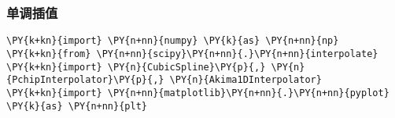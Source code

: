     \hypertarget{ux5355ux8c03ux63d2ux503c}{%
\subsubsection{单调插值}\label{ux5355ux8c03ux63d2ux503c}}

    \begin{tcolorbox}[breakable, size=fbox, boxrule=1pt, pad at break*=1mm,colback=cellbackground, colframe=cellborder]
\begin{Verbatim}[commandchars=\\\{\}]
\PY{k+kn}{import} \PY{n+nn}{numpy} \PY{k}{as} \PY{n+nn}{np}
\PY{k+kn}{from} \PY{n+nn}{scipy}\PY{n+nn}{.}\PY{n+nn}{interpolate} \PY{k+kn}{import} \PY{n}{CubicSpline}\PY{p}{,} \PY{n}{PchipInterpolator}\PY{p}{,} \PY{n}{Akima1DInterpolator}
\PY{k+kn}{import} \PY{n+nn}{matplotlib}\PY{n+nn}{.}\PY{n+nn}{pyplot} \PY{k}{as} \PY{n+nn}{plt}
\end{Verbatim}
\end{tcolorbox}

